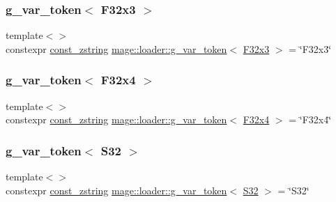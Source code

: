 \mbox{\label{namespacemage_1_1loader_a96f6bd7e12009e96e1194ff6e1a7ed22}} 
\subsubsection{\texorpdfstring{g\+\_\+var\+\_\+token$<$ F32x3 $>$}{g\_var\_token< F32x3 >}}
{\footnotesize\ttfamily template$<$$>$ \\
constexpr \mbox{\hyperlink{namespacemage_abfd9206dc607ceb5d13ec68bf075a5c0}{const\+\_\+zstring}} \mbox{\hyperlink{namespacemage_1_1loader_af955278eb72ed57ce15bc79d4d074b3a}{mage\+::loader\+::g\+\_\+var\+\_\+token}}$<$ \mbox{\hyperlink{namespacemage_a1e3c7a882af461f161caa1cbddaf1fa2}{F32x3}} $>$ = \char`\"{}F32x3\char`\"{}}

\mbox{\label{namespacemage_1_1loader_a2f4e759baaf1713c41722c8332ff85f0}} 
\subsubsection{\texorpdfstring{g\+\_\+var\+\_\+token$<$ F32x4 $>$}{g\_var\_token< F32x4 >}}
{\footnotesize\ttfamily template$<$$>$ \\
constexpr \mbox{\hyperlink{namespacemage_abfd9206dc607ceb5d13ec68bf075a5c0}{const\+\_\+zstring}} \mbox{\hyperlink{namespacemage_1_1loader_af955278eb72ed57ce15bc79d4d074b3a}{mage\+::loader\+::g\+\_\+var\+\_\+token}}$<$ \mbox{\hyperlink{namespacemage_a851648f37dfb126a2d2f973e102861ad}{F32x4}} $>$ = \char`\"{}F32x4\char`\"{}}

\mbox{\label{namespacemage_1_1loader_adc4b1d2ff450d4683918426296232d2c}} 
\subsubsection{\texorpdfstring{g\+\_\+var\+\_\+token$<$ S32 $>$}{g\_var\_token< S32 >}}
{\footnotesize\ttfamily template$<$$>$ \\
constexpr \mbox{\hyperlink{namespacemage_abfd9206dc607ceb5d13ec68bf075a5c0}{const\+\_\+zstring}} \mbox{\hyperlink{namespacemage_1_1loader_af955278eb72ed57ce15bc79d4d074b3a}{mage\+::loader\+::g\+\_\+var\+\_\+token}}$<$ \mbox{\hyperlink{namespacemage_a2ef1a005a77358f1825d13fd481b557f}{S32}} $>$ = \char`\"{}S32\char`\"{}}

